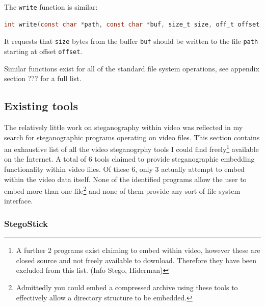 \documentclass[paper=a4, fontsize=11pt,twoside]{scrartcl}    %
\numberwithin{table}{section}
\numberwithin{figure}{section}
\numberwithin{algorithm}{section}
\begin{document}
The \texttt{write} function is similar:

\begin{lstlisting}[language=C, caption={\texttt{FUSE} write operation.}, frame=single]
int write(const char *path, const char *buf, size_t size, off_t offset, struct fuse_file_info *fi);
\end{lstlisting}

\noindent
It requests that \texttt{size} bytes from the buffer \texttt{buf} should be written to the file \texttt{path} starting at offset \texttt{offset}.

Similar functions exist for all of the standard file system operations, see appendix section ??? for a full list. 

\subsection{Existing tools}
\label{tools}
The relatively little work on steganography within video was reflected in my search for steganographic programs operating on video files. This section contains an exhaustive list of all the video steganogrphy tools I could find freely\footnote{A further 2 programs exist claiming to embed within video, however these are closed source and not freely available to download. Therefore they have been excluded from this list. (Info Stego, Hiderman)} available on the Internet. A total of 6 tools claimed to provide steganographic embedding functionality within video files. Of these 6, only 3 actually attempt to embed within the video data itself. None of the identified programs allow the user to embed more than one file\footnote{Admittedly you could embed a compressed archive using these tools to effectively allow a directory structure to be embedded.}  and none of them provide any sort of file system interface.

\subsubsection{StegoStick}
\end{document}
